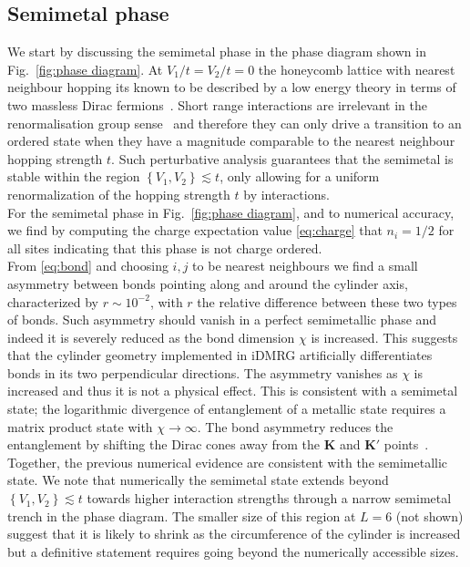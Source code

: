 \documentclass[aps,prx,10pt,twocolumn,floatfix,superscriptaddress,showpacs,numerical,footinbib]{revtex4-1}
\begin{document}
%

\subsection{Semimetal phase \label{subsec:SM}}
%
We start by discussing the semimetal phase in the phase diagram shown in Fig.~\ref{fig:phase diagram}.
%
At $V_{1}/t=V_{2}/t=0$ the honeycomb lattice with nearest neighbour hopping its 
known to be described by a low energy theory in terms of two massless Dirac fermions~\cite{CastroNeto2009}.
%
Short range interactions are irrelevant in the renormalisation group sense~\cite{S94,KUP12} 
and therefore they can only drive a transition to an ordered state when they have a magnitude comparable to the nearest neighbour hopping strength $t$.
%
Such perturbative analysis guarantees that the semimetal is stable within
the region $\left\lbrace V_{1},V_{2}\right\rbrace \lesssim t$, only allowing for a uniform renormalization 
of the hopping strength $t$ by interactions.\\

%
For the semimetal phase in Fig.~\ref{fig:phase diagram}, and to numerical accuracy, we find by computing the charge expectation value
\eqref{eq:charge} that $n_{i}=1/2$ for all sites indicating that this phase is not charge ordered.\\
%
From \eqref{eq:bond} and choosing $i,j$ to be nearest neighbours we find
a small asymmetry between bonds pointing along and around the cylinder axis,
characterized by $r\sim10^{-2}$, with $r$ the relative difference between these two types of bonds.
%
Such asymmetry should vanish in a perfect semimetallic phase and indeed it is severely reduced as the bond dimension $\chi$ is increased.
% 
This suggests that the cylinder geometry implemented in iDMRG artificially differentiates bonds in its two perpendicular directions.
%
The asymmetry vanishes as $\chi$ is increased and thus it is not a physical effect.
%
This is consistent with a semimetal state; the logarithmic divergence of entanglement of a metallic state requires a matrix product state with $\chi\to\infty$. 
%
The bond asymmetry reduces the entanglement by shifting the Dirac cones away from the $\mathbf{K}$ and $\mathbf{K'}$ points~\cite{ACJ15}.\\
%
%
Together, the previous numerical evidence are consistent with the semimetallic state.
%
We note that numerically the semimetal state extends beyond $\left\lbrace V_{1},V_{2}\right\rbrace \lesssim t$ towards
higher interaction strengths through a narrow semimetal trench in the phase diagram.
%
The smaller size of this region at $L=6$ (not shown) suggest that it is likely to shrink as the circumference of the cylinder is increased but
a definitive statement requires going beyond the numerically accessible sizes. 
%
\end{document}
